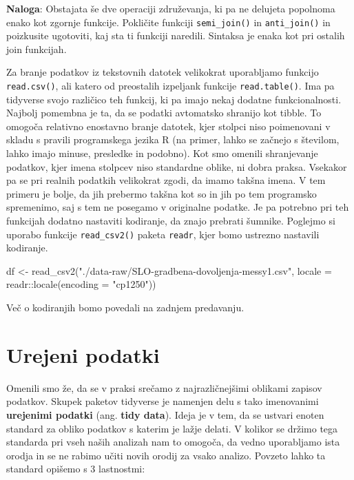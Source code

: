 \documentclass[
]{book}
\newenvironment{Shaded}{\begin{snugshade}}{\end{snugshade}}
\newcommand{\AttributeTok}[1]{\textcolor[rgb]{0.77,0.63,0.00}{#1}}
\newcommand{\FunctionTok}[1]{\textcolor[rgb]{0.00,0.00,0.00}{#1}}
\newcommand{\NormalTok}[1]{#1}
\newcommand{\OtherTok}[1]{\textcolor[rgb]{0.56,0.35,0.01}{#1}}
\newcommand{\SpecialCharTok}[1]{\textcolor[rgb]{0.00,0.00,0.00}{#1}}
\newcommand{\StringTok}[1]{\textcolor[rgb]{0.31,0.60,0.02}{#1}}
\begin{document}
\textbf{Naloga}: Obstajata še dve operaciji združevanja, ki pa ne delujeta popolnoma enako kot zgornje funkcije. Pokličite funkciji \texttt{semi\_join()} in \texttt{anti\_join()} in poizkusite ugotoviti, kaj sta ti funkciji naredili. Sintaksa je enaka kot pri ostalih join funkcijah.

Za branje podatkov iz tekstovnih datotek velikokrat uporabljamo funkcijo \texttt{read.csv()}, ali katero od preostalih izpeljank funkcije \texttt{read.table()}. Ima pa tidyverse svojo različico teh funkcij, ki pa imajo nekaj dodatne funkcionalnosti. Najbolj pomembna je ta, da se podatki avtomatsko shranijo kot tibble. To omogoča relativno enostavno branje datotek, kjer stolpci niso poimenovani v skladu s pravili programskega jezika R (na primer, lahko se začnejo s številom, lahko imajo minuse, presledke in podobno). Kot smo omenili shranjevanje podatkov, kjer imena stolpcev niso standardne oblike, ni dobra praksa. Vsekakor pa se pri realnih podatkih velikokrat zgodi, da imamo takšna imena. V tem primeru je bolje, da jih prebermo takšna kot so in jih po tem programsko spremenimo, saj s tem ne posegamo v originalne podatke. Je pa potrebno pri teh funkcijah dodatno nastaviti kodiranje, da znajo prebrati šumnike. Poglejmo si uporabo funkcije \texttt{read\_csv2()} paketa \texttt{readr}, kjer bomo ustrezno nastavili kodiranje.

\begin{Shaded}
\begin{Highlighting}[]
\NormalTok{df }\OtherTok{\textless{}{-}} \FunctionTok{read\_csv2}\NormalTok{(}\StringTok{"./data{-}raw/SLO{-}gradbena{-}dovoljenja{-}messy1.csv"}\NormalTok{,}
                \AttributeTok{locale =}\NormalTok{ readr}\SpecialCharTok{::}\FunctionTok{locale}\NormalTok{(}\AttributeTok{encoding =} \StringTok{"cp1250"}\NormalTok{))}
\end{Highlighting}
\end{Shaded}

Več o kodiranjih bomo povedali na zadnjem predavanju.

\hypertarget{urejeni-podatki}{%
\section{Urejeni podatki}\label{urejeni-podatki}}

Omenili smo že, da se v praksi srečamo z najrazličnejšimi oblikami zapisov podatkov. Skupek paketov tidyverse je namenjen delu s tako imenovanimi \textbf{urejenimi podatki} (ang. \textbf{tidy data}). Ideja je v tem, da se ustvari enoten standard za obliko podatkov s katerim je lažje delati. V kolikor se držimo tega standarda pri vseh naših analizah nam to omogoča, da vedno uporabljamo ista orodja in se ne rabimo učiti novih orodij za vsako analizo. Povzeto lahko ta standard opišemo s 3 lastnostmi:
\end{document}
